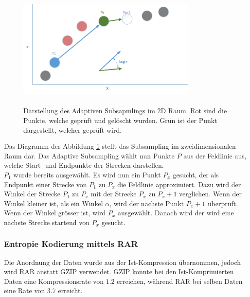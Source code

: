 \begin{figure}[!htbp]
	\center
	\includegraphics[width=0.8\textwidth,height=6cm,keepaspectratio]{./pictures/konzept/solution0/anglesubsampling.png}
	\caption{Darstellung des Adaptiven Subsapmlings im 2D Raum. Rot sind die Punkte, welche geprüft und gelöscht wurden. Grün ist der Punkt dargestellt, welcher geprüft wird.}
	\label{konzept:loesung0:angle}
\end{figure}
Das Diagramm der Abbildung \ref{konzept:loesung0:angle} stellt das Subsampling im zweidimensionalen Raum dar. Das Adaptive Subsampling wählt nun Punkte $P$ aus der Feldlinie aus, welche Start- und Endpunkte der Strecken darstellen.\\
$P_1$ wurde bereits ausgewählt. Es wird nun ein Punkt $P_x$ gesucht, der als Endpunkt einer Strecke von $P_1$ zu $P_x$ die Feldlinie approximiert. Dazu wird der Winkel der Strecke $P_1$ zu $P_x$ mit der Strecke $P_x$ zu $P_x+1$ verglichen. Wenn der Winkel kleiner ist, als ein Winkel $\alpha$, wird der nächste Punkt $P_x+1$ überprüft. Wenn der Winkel grösser ist, wird $P_x$ ausgewählt. Danach wird der wird eine nächste Strecke startend von $P_x$ gesucht.

\subsubsection{Entropie Kodierung mittels RAR} \label{konzept:loesung0:kodierung}
Die Anordnung der Daten wurde aus der Ist-Kompression übernommen, jedoch wird RAR anstatt GZIP verwendet. GZIP konnte bei den Ist-Komprimierten Daten eine Kompressionsrate von $1.2$ erreichen, während RAR bei selben Daten eine Rate von $3.7$ erreicht.
\pagebreak

